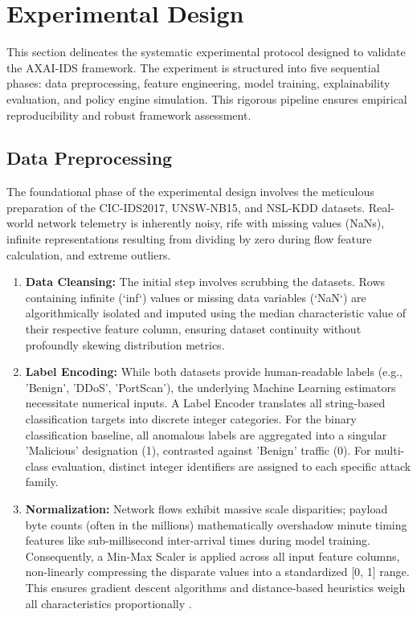 \documentclass[conference]{IEEEtran}
\begin{document}
\section{Experimental Design}

This section delineates the systematic experimental protocol designed to validate the AXAI-IDS framework. The experiment is structured into five sequential phases: data preprocessing, feature engineering, model training, explainability evaluation, and policy engine simulation. This rigorous pipeline ensures empirical reproducibility and robust framework assessment.

\subsection{Data Preprocessing}
The foundational phase of the experimental design involves the meticulous preparation of the CIC-IDS2017, UNSW-NB15, and NSL-KDD datasets. Real-world network telemetry is inherently noisy, rife with missing values (NaNs), infinite representations resulting from dividing by zero during flow feature calculation, and extreme outliers. 

\begin{enumerate}
\item \textbf{Data Cleansing:} The initial step involves scrubbing the datasets. Rows containing infinite (`inf`) values or missing data variables (`NaN`) are algorithmically isolated and imputed using the median characteristic value of their respective feature column, ensuring dataset continuity without profoundly skewing distribution metrics.
\item \textbf{Label Encoding:} While both datasets provide human-readable labels (e.g., 'Benign', 'DDoS', 'PortScan'), the underlying Machine Learning estimators necessitate numerical inputs. A Label Encoder translates all string-based classification targets into discrete integer categories. For the binary classification baseline, all anomalous labels are aggregated into a singular 'Malicious' designation (1), contrasted against 'Benign' traffic (0). For multi-class evaluation, distinct integer identifiers are assigned to each specific attack family.
\item \textbf{Normalization:} Network flows exhibit massive scale disparities; payload byte counts (often in the millions) mathematically overshadow minute timing features like sub-millisecond inter-arrival times during model training. Consequently, a Min-Max Scaler is applied across all input feature columns, non-linearly compressing the disparate values into a standardized [0, 1] range. This ensures gradient descent algorithms and distance-based heuristics weigh all characteristics proportionally \cite{ke2017lightgbm}.
\end{enumerate}
\end{document}
